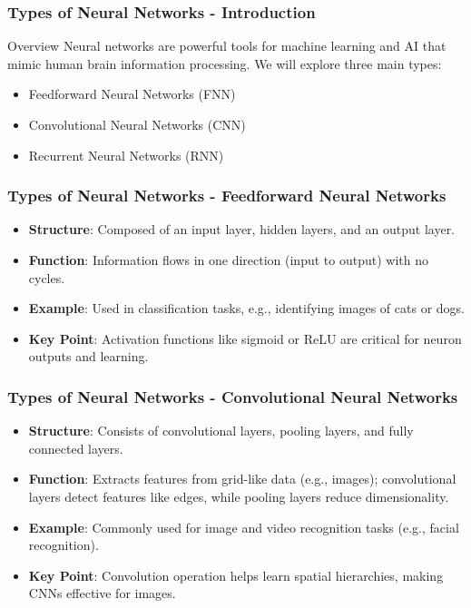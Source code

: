 \documentclass[aspectratio=169]{beamer}
\begin{document}
\begin{frame}[fragile]
    \frametitle{Types of Neural Networks - Introduction}
    \begin{block}{Overview}
        Neural networks are powerful tools for machine learning and AI that mimic human brain information processing. 
        We will explore three main types:
        \begin{itemize}
            \item Feedforward Neural Networks (FNN)
            \item Convolutional Neural Networks (CNN)
            \item Recurrent Neural Networks (RNN)
        \end{itemize}
    \end{block}
\end{frame}

\begin{frame}[fragile]
    \frametitle{Types of Neural Networks - Feedforward Neural Networks}
    \begin{itemize}
        \item \textbf{Structure}: Composed of an input layer, hidden layers, and an output layer.
        \item \textbf{Function}: Information flows in one direction (input to output) with no cycles.
        \item \textbf{Example}: Used in classification tasks, e.g., identifying images of cats or dogs.
        \item \textbf{Key Point}: Activation functions like sigmoid or ReLU are critical for neuron outputs and learning.
    \end{itemize}
\end{frame}

\begin{frame}[fragile]
    \frametitle{Types of Neural Networks - Convolutional Neural Networks}
    \begin{itemize}
        \item \textbf{Structure}: Consists of convolutional layers, pooling layers, and fully connected layers.
        \item \textbf{Function}: Extracts features from grid-like data (e.g., images); convolutional layers detect features like edges, while pooling layers reduce dimensionality.
        \item \textbf{Example}: Commonly used for image and video recognition tasks (e.g., facial recognition).
        \item \textbf{Key Point}: Convolution operation helps learn spatial hierarchies, making CNNs effective for images.
    \end{itemize}
\end{frame}
\end{document}
